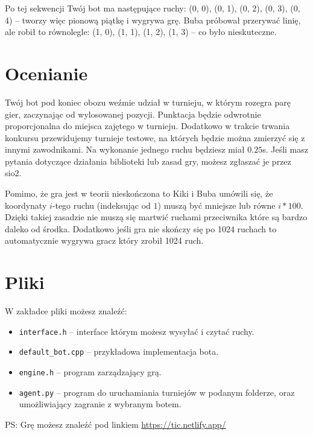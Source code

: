 \documentclass{spiral}
\begin{document}
\bigskip

\noindent
\noindent Po tej sekwencji Twój bot ma następujące ruchy: (0, 0), (0, 1), (0,
2), (0, 3), (0, 4) – tworzy więc pionową piątkę i wygrywa grę. Buba próbował
przerywać linię, ale robił to równolegle: (1, 0), (1, 1), (1, 2),
(1, 3) – co było nieskuteczne.


\section{Ocenianie}
\noindent Twój bot pod koniec obozu weźmie udział w turnieju, w którym rozegra
parę gier, zaczynając od wylosowanej pozycji. Punktacja będzie odwrotnie
proporcjonalna do miejsca zajętego w turnieju. Dodatkowo w trakcie trwania
konkursu przewidujemy turnieje testowe, na których będzie można zmierzyć się z
innymi zawodnikami. Na wykonanie jednego ruchu będziesz miał $0.25$s. Jeśli
masz pytania dotyczące działania biblioteki lub zasad gry, możesz zgłaszać je
przez sio2.

\noindent Pomimo, że gra jest w teorii nieskończona to Kiki i Buba umówili się,
że koordynaty $i$-tego ruchu (indeksując od $1$) muszą być mniejsze lub równe
$i * 100$. Dzięki takiej zasadzie nie muszą się martwić ruchami przeciwnika
które są bardzo daleko od środka.
\noindent Dodatkowo jeśli gra nie skończy się po 1024 ruchach to automatycznie
wygrywa gracz który zrobił 1024 ruch.

\section{Pliki}
\noindent
W zakładce pliki możesz znaleźć:
\begin{itemize}
	\item \texttt{interface.h} – interface którym możesz wysyłać i czytać
	      ruchy.
	\item \texttt{default\_bot.cpp} – przykładowa implementacja bota.
	\item \texttt{engine.h} – program zarządzający grą.
	\item \texttt{agent.py} – program do uruchamiania turniejów w podanym
	      folderze, oraz umożliwiający zagranie z wybranym botem.

\end{itemize}

\vfill
\noindent PS: Grę możesz znaleźć pod linkiem
\href{https://tic.netlify.app/}{https://tic.netlify.app/}
\end{document}

